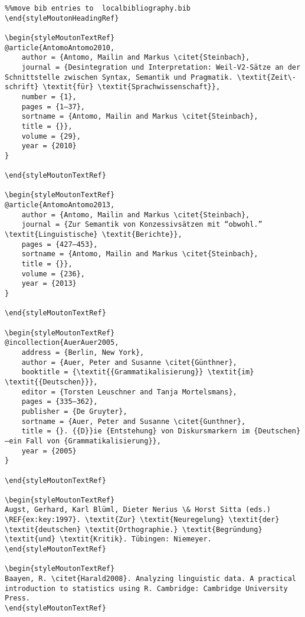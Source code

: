 \begin{styleMoutonHeadingRef}
\begin{verbatim}%%move bib entries to  localbibliography.bib
\end{styleMoutonHeadingRef}

\begin{styleMoutonTextRef}
@article{AntomoAntomo2010,
	author = {Antomo, Mailin and Markus \citet{Steinbach},
	journal = {Desintegration und Interpretation: Weil-V2-Sätze an der Schnittstelle zwischen Syntax, Semantik und Pragmatik. \textit{Zeit\-schrift} \textit{für} \textit{Sprachwissenschaft}},
	number = {1},
	pages = {1–37},
	sortname = {Antomo, Mailin and Markus \citet{Steinbach},
	title = {}},
	volume = {29},
	year = {2010}
}

\end{styleMoutonTextRef}

\begin{styleMoutonTextRef}
@article{AntomoAntomo2013,
	author = {Antomo, Mailin and Markus \citet{Steinbach},
	journal = {Zur Semantik von Konzessivsätzen mit “obwohl.” \textit{Linguistische} \textit{Berichte}},
	pages = {427–453},
	sortname = {Antomo, Mailin and Markus \citet{Steinbach},
	title = {}},
	volume = {236},
	year = {2013}
}

\end{styleMoutonTextRef}

\begin{styleMoutonTextRef}
@incollection{AuerAuer2005,
	address = {Berlin, New York},
	author = {Auer, Peter and Susanne \citet{Günthner},
	booktitle = {\textit{{Grammatikalisierung}} \textit{im} \textit{{Deutschen}}},
	editor = {Torsten Leuschner and Tanja Mortelsmans},
	pages = {335–362},
	publisher = {De Gruyter},
	sortname = {Auer, Peter and Susanne \citet{Gunthner},
	title = {}. {{D}}ie {Entstehung} von Diskursmarkern im {Deutschen}—ein Fall von {Grammatikalisierung}},
	year = {2005}
}

\end{styleMoutonTextRef}

\begin{styleMoutonTextRef}
Augst, Gerhard, Karl Blüml, Dieter Nerius \& Horst Sitta (eds.) \REF{ex:key:1997}. \textit{Zur} \textit{Neuregelung} \textit{der} \textit{deutschen} \textit{Orthographie.} \textit{Begründung} \textit{und} \textit{Kritik}. Tübingen: Niemeyer.
\end{styleMoutonTextRef}

\begin{styleMoutonTextRef}
Baayen, R. \citet{Harald2008}. Analyzing linguistic data. A practical introduction to statistics using R. Cambridge: Cambridge University Press.
\end{styleMoutonTextRef}


\end{verbatim}
\end{styleMoutonHeadingRef}
